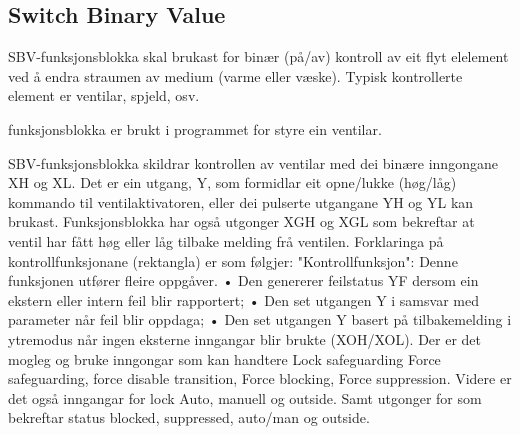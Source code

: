 \newpage

\subsection{Switch Binary Value}

\gls{SBV}-funksjonsblokka skal brukast for binær (på/av) kontroll av eit flyt elelement ved å endra straumen av medium (varme eller væske). 
Typisk kontrollerte element er ventilar, spjeld, osv.

funksjonsblokka er brukt i programmet for styre ein ventilar.

SBV-funksjonsblokka skildrar kontrollen av ventilar med dei binære inngongane XH og XL. Det er ein utgang, Y, som formidlar eit opne/lukke (høg/låg) kommando til ventilaktivatoren, eller dei pulserte utgangane YH og YL kan brukast. Funksjonsblokka har også utgonger XGH og XGL som bekreftar at ventil har fått høg eller låg tilbake melding frå ventilen.
Forklaringa på kontrollfunksjonane (rektangla) er som følgjer: "Kontrollfunksjon": Denne funksjonen utfører fleire oppgåver.
• Den genererer feilstatus YF dersom ein ekstern eller intern feil blir rapportert;
• Den set utgangen Y i samsvar med parameter når feil blir oppdaga;
• Den set utgangen Y basert på tilbakemelding i ytremodus når ingen eksterne inngangar blir brukte (XOH/XOL).
Der er det mogleg og bruke inngongar som kan handtere Lock safeguarding Force safeguarding, force disable transition, Force blocking, Force suppression. Videre er det også inngangar for lock Auto, manuell og outside.
Samt utgonger for som bekreftar status blocked, suppressed, auto/man og outside.

